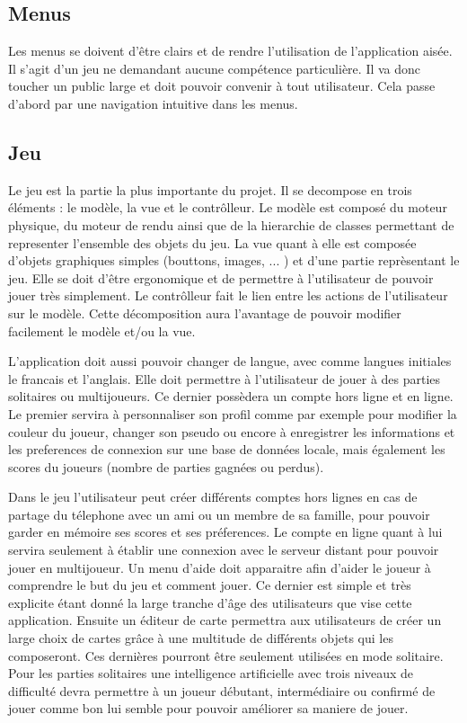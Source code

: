\subsection{Menus}
		
	Les menus se doivent d'être clairs et de rendre l'utilisation de
	l'application aisée. Il s'agit d'un jeu ne demandant aucune compétence
	particulière. Il va donc toucher un public large et doit pouvoir convenir à
	tout utilisateur. Cela passe d'abord par une navigation intuitive dans les
	menus.
		
\subsection{Jeu}
		
	Le jeu est la partie la plus importante du projet. 
	Il se decompose en trois éléments : le modèle, la vue et le contrôlleur. 
	Le modèle est composé du moteur physique, du moteur de rendu ainsi que de la
	hierarchie de classes permettant de representer l'ensemble des objets du jeu. 
	La vue quant à elle est composée d'objets graphiques simples (bouttons, images, ... ) 
	et d'une partie reprèsentant le jeu. Elle se doit d'être ergonomique et de permettre
	à l'utilisateur de pouvoir jouer très simplement. Le contrôlleur fait
	le lien entre les actions de l'utilisateur sur le modèle. Cette décomposition aura
	l'avantage de pouvoir modifier facilement le modèle et/ou la vue.
		
	L'application doit aussi pouvoir changer de langue, avec comme langues initiales le francais et l'anglais.
	Elle doit permettre à l'utilisateur de jouer à des parties solitaires ou multijoueurs. 
	Ce dernier possèdera un compte hors ligne et en ligne.		
	Le premier servira à personnaliser son profil comme par exemple pour modifier
	la couleur du joueur, changer son pseudo ou encore à enregistrer les informations
	et les preferences de connexion sur une base de données locale,
	mais également les scores du joueurs (nombre de parties gagnées ou perdus).
	
	Dans le jeu l'utilisateur peut créer différents comptes hors lignes en cas de partage du télephone
	avec un ami ou un membre de sa famille, pour pouvoir garder en mémoire ses scores et ses préferences.		
	Le compte en ligne quant à lui servira seulement à établir une connexion avec le serveur distant pour pouvoir jouer en multijoueur.		
	Un menu d'aide doit apparaitre afin d'aider le joueur à comprendre le but du jeu et comment jouer. 
	Ce dernier est simple et très explicite étant donné la large tranche d'âge des utilisateurs que vise cette application.		
	Ensuite un éditeur de carte permettra aux utilisateurs de créer un large choix de cartes
	grâce à une multitude de différents objets qui les composeront. Ces dernières pourront être seulement utilisées en mode solitaire.
	Pour les parties solitaires une intelligence artificielle avec trois niveaux de difficulté 
	devra permettre à un joueur débutant, intermédiaire ou confirmé de jouer comme bon lui semble pour pouvoir améliorer sa maniere de jouer.
	
